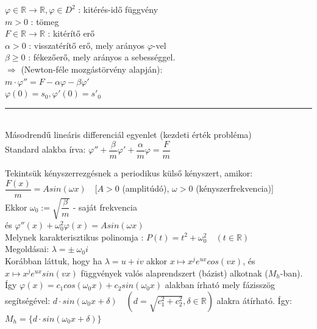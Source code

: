 \documentclass[margin=0px]{article}
\newcommand{\R}{\mathbb{R}}
\begin{document}
\begin{description}
					$ \varphi \in \R \rightarrow \R, \varphi \in D^2$ : kitérés-idő függvény \\
					$ m > 0 $ : tömeg \\
					$ F \in \R \rightarrow \R $ : kitérítő erő \\
					$ \alpha > 0 $ : visszatérítő erő, mely arányos $ \varphi $-vel \\
					$ \beta \geq 0 $ : fékezőerő, mely arányos a sebességgel. \\
					$ \Longrightarrow $ (Newton-féle mozgástörvény alapján):\\
					$ m \cdot \varphi'' = F - \alpha\varphi-\beta\varphi'$\\
					$ \varphi(0) = s_0, \varphi'(0) = s'_0 $\\
					\rule{4cm}{0.2pt} \\
					Másodrendű lineáris differenciál egyenlet (kezdeti érték probléma)\\
					Standard alakba írva: $ \varphi'' + \dfrac{\beta}{m}\varphi' + \dfrac{\alpha}{m}\varphi = \dfrac{F}{m} $
					
					Tekintsük kényszerrezgésnek a periodikus külső kényszert, amikor: \\
					$ \dfrac{F(x)}{m} = Asin(\omega x )  \quad [A>0$ (amplitúdó), $ \omega > 0$ (kényszerfrekvencia)] \\ 
					Ekkor $ \omega_0 := \sqrt{\dfrac{\beta}{m}} $ - saját frekvencia\\
					és $\varphi''(x) + \omega_0^2\varphi(x) = Asin(\omega x) $ \\
					Melynek karakterisztikus polinomja : $ P(t) = t^2+\omega_0^2 \quad (t \in \R) $ \\
					Megoldásai: $ \lambda = \pm \ \omega_0i $ \\
					
					Korábban láttuk, hogy ha $ \lambda = u+iv$ akkor $ x \mapsto x^je^{ux}cos(vx)$, és $x \mapsto x^je^{ux}sin(vx)$ függvények valós alaprendszert (bázist) alkotnak ($M_h$-ban). Így $ \varphi(x) = c_1cos(\omega_0x) + c_2sin(\omega_0x) $ alakban írható mely fázisszög segítségével: $ d\cdot sin(\omega_0x+\delta) \quad (d = \sqrt{c_1^2+c_2^2}, \delta \in \R)$ alakra átírható. Így: \\
					$ M_h =  \{ d\cdot sin(\omega_0x+\delta)\}$
					

\end{description}
\end{document}

